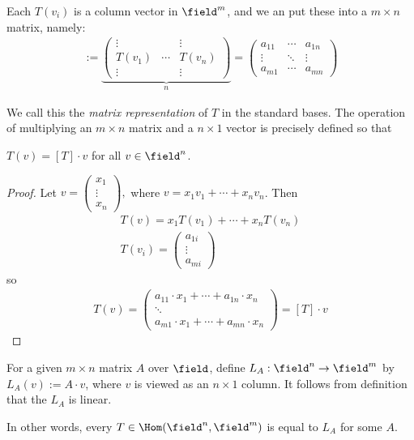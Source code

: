 Each $T(v_i)$ is a column vector in $\field^m$, and we an put these into a $m \times n$ matrix, namely:
\begin{align*}
    [T] := \underbrace{\begin{pmatrix}
        \vdots & & \vdots \\
        T(v_1) & \cdots & T(v_n) \\
        \vdots & & \vdots 
    \end{pmatrix}}_{n} = \begin{pmatrix}
        a_{11} & \cdots & a_{1n}\\
        \vdots & \ddots & \vdots\\
        a_{m1} & \cdots & a_{mn}
    \end{pmatrix}
\end{align*}

We call this the \emph{matrix representation} of $T$ in the standard bases. The operation of multiplying an $m \times n$ matrix and a $n \times 1$ vector is precisely defined so that \begin{proposition}
    $T(v) = [T] \cdot v$ for all $v \in \field^n$.
\end{proposition}

\begin{proof}
    Let $v = \begin{pmatrix}
        x_1\\
        \vdots\\
        x_n
    \end{pmatrix},$ where $v = x_1 v_1 + \cdots + x_n v_n$. Then \begin{align*}
        T(v) = x_1 T(v_1) + \cdots + x_n T(v_n)\\
        T(v_i) = \begin{pmatrix}
            a_{1i}\\
            \vdots\\
            a_{mi}
        \end{pmatrix}
    \end{align*}
    so
    \begin{align*}
        T(v) = \begin{pmatrix}
            a_{11} \cdot x_1 + \cdots + a_{1n} \cdot x_n\\
            \ddots \\
            a_{m1} \cdot x_1 + \cdots + a_{mn} \cdot x_n
        \end{pmatrix} = [T]\cdot v  
    \end{align*}
\end{proof}

\begin{definition}
    For a given $m \times n$ matrix $A$ over $\field$, define $L_A : \field^n \to \field^m$ by $L_A (v) := A \cdot v$, where $v$ is viewed as an $n \times 1$ column. It follows from definition that the $L_A$ is linear.

    In other words, every $T \in \Hom(\field^n, \field^m)$ is equal to $L_A$ for some $A$.
\end{definition}